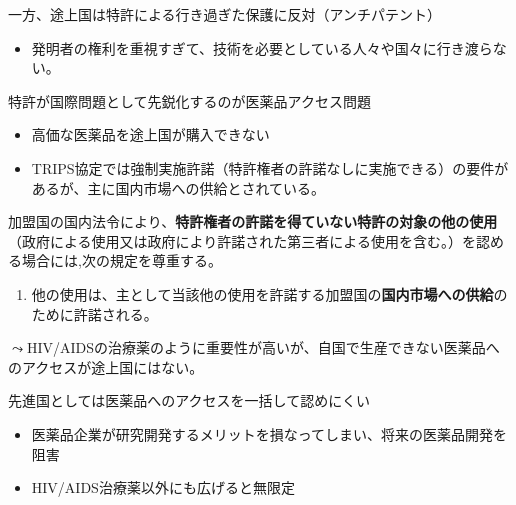\documentclass[
  xelatex,
  ja=standard]{bxjsarticle}
\providecommand{\tightlist}{%
  \setlength{\itemsep}{0pt}\setlength{\parskip}{0pt}}\usepackage{longtable,booktabs,array}
\begin{document}
一方、途上国は特許による行き過ぎた保護に反対（アンチパテント）

\begin{itemize}
\tightlist
\item
  発明者の権利を重視すぎて、技術を必要としている人々や国々に行き渡らない。
\end{itemize}

特許が国際問題として先鋭化するのが医薬品アクセス問題

\begin{itemize}
\tightlist
\item
  高価な医薬品を途上国が購入できない
\item
  TRIPS協定では強制実施許諾（特許権者の許諾なしに実施できる）の要件があるが、主に国内市場への供給とされている。
\end{itemize}

\begin{tcolorbox}[enhanced jigsaw, toprule=.15mm, leftrule=.75mm, coltitle=black, opacityback=0, colback=white, title=\textcolor{quarto-callout-note-color}{\faInfo}\hspace{0.5em}{\href{https://www.jpo.go.jp/system/laws/gaikoku/trips/index.html}{TRIPS協定}　第31条}, rightrule=.15mm, bottomrule=.15mm, colbacktitle=quarto-callout-note-color!10!white, opacitybacktitle=0.6, titlerule=0mm, colframe=quarto-callout-note-color-frame, bottomtitle=1mm, toptitle=1mm, arc=.35mm, left=2mm, breakable]

加盟国の国内法令により、\textbf{特許権者の許諾を得ていない特許の対象の他の使用}（政府による使用又は政府により許諾された第三者による使用を含む。）を認める場合には,次の規定を尊重する。

\begin{enumerate}
\def\labelenumi{\alph{enumi}.}
\setcounter{enumi}{5}
\tightlist
\item
  他の使用は、主として当該他の使用を許諾する加盟国の\textbf{国内市場への供給}のために許諾される。
\end{enumerate}

\end{tcolorbox}

\(\leadsto\)HIV/AIDSの治療薬のように重要性が高いが、自国で生産できない医薬品へのアクセスが途上国にはない。

先進国としては医薬品へのアクセスを一括して認めにくい

\begin{itemize}
\tightlist
\item
  医薬品企業が研究開発するメリットを損なってしまい、将来の医薬品開発を阻害
\item
  HIV/AIDS治療薬以外にも広げると無限定
\end{itemize}
\end{document}

